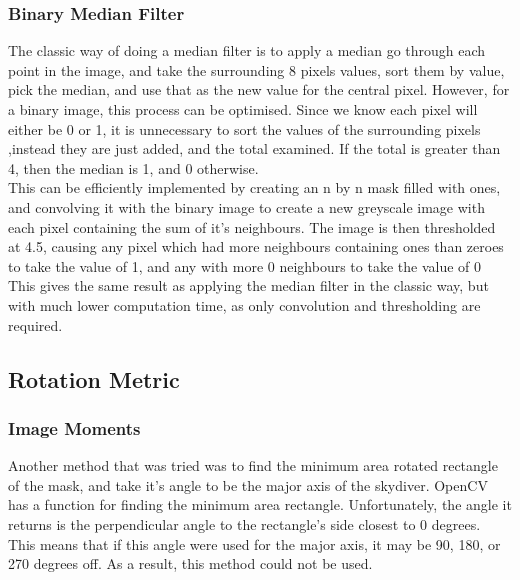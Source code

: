 \documentclass[a4paper, 12pt]{article}
\begin{document}
		\subsubsection{Binary Median Filter}
	The classic way of doing a median filter is to apply a median go through each point in the image, and take the surrounding
	8 pixels values, sort them by value, pick the median, and use that as the new value for the central pixel.
	However, for a binary image, this process can be optimised.
	Since we know each pixel will either be 0 or 1, it is unnecessary to sort the values of the surrounding pixels
	,instead they are just added, and the total examined. If the total is greater than 4, then
	the median is 1, and 0 otherwise.\\
	This can be efficiently implemented by creating an n by n mask filled 
	with ones, and convolving it with the binary image to create a new greyscale image with each pixel containing the sum of
	it's neighbours. The image is then thresholded at 4.5, causing any pixel which had more neighbours containing ones than zeroes
	to take the value of 1, and any with more 0 neighbours to take the value of 0
	This gives the same result as applying the median filter in the classic way, but with much lower computation time, as only convolution and thresholding 	are required.
	\subsection{Rotation Metric}
		\subsubsection{Image Moments}
		Another method that was tried was to find the minimum area rotated rectangle of the mask, and take it's angle to be the major axis of the 				skydiver. 
		OpenCV has a function for finding the minimum area rectangle. Unfortunately, the angle it returns is the perpendicular angle to the rectangle's
		side closest to 0 degrees. This means that if this angle were used for the major axis, it may be 90, 180, or 270 degrees off.
		As a result, this method could not be used.
\end{document}
